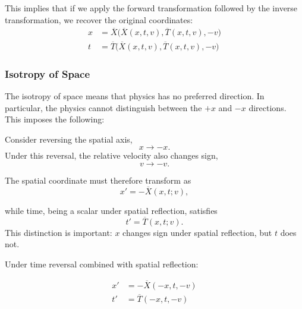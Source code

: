 		This implies that if we apply the forward transformation followed by the inverse transformation, 
		we recover the original coordinates:
		\begin{equation}
			\begin{aligned}
				x &= \overline{X}\bigl(\overline{X}(x,t,v), \overline{T}(x,t,v), -v\bigr) \\
				t &= \overline{T}\bigl(\overline{X}(x,t,v), \overline{T}(x,t,v), -v\bigr)
			\end{aligned}
			\label{eq:composition-identity}
		\end{equation}

		\subsubsection{Isotropy of Space}

		The isotropy of space means that physics has no preferred direction. 
		In particular, the physics cannot distinguish between the $+x$ and $-x$ directions.
		This imposes the following:

		Consider reversing the spatial axis,
		\begin{equation}
			x\rightarrow -x.
		\end{equation}
		Under this reversal, the relative velocity also changes sign,
		\begin{equation}
			v\rightarrow -v.
		\end{equation}

		The spatial coordinate must therefore transform as
		\begin{equation}
			x'=-\overline X(x,t;v),
		\end{equation}

		while time, being a scalar under spatial reflection, satisfies
		\begin{equation}
			t'=\overline T(x,t;v).
		\end{equation}
		This distinction is important: $x$ changes sign under spatial reflection, but $t$ does not.

		Under time reversal combined with spatial reflection:

		\begin{equation}
			\begin{aligned}
				x' &= -\overline{X}(-x, t, -v) \\
				t' &= \overline{T}(-x, t, -v)
			\end{aligned}
			\label{eq:isotropy-conditions}
		\end{equation}

